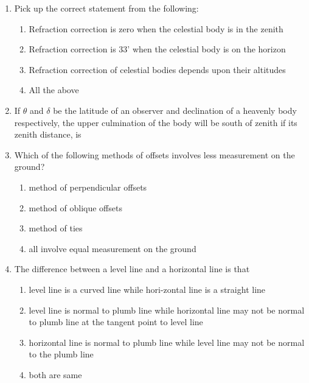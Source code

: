 \documentclass[11pt,a4paper]{article}
\begin{document}
\begin{enumerate}
\begin{enumerate}[label=\Alph*.]
\end{enumerate}
\item{Pick up the correct statement from the following:}
\begin{enumerate}[label=\Alph*.]
\item{Refraction correction is zero when the celestial body is in the zenith}
\item{Refraction correction is 33' when the celestial body is on the horizon}
\item{Refraction correction of celestial bodies depends upon their altitudes}
\item{All the above}
\end{enumerate}
\item{If $\theta$ and $\delta$ be the latitude of an observer and declination of a heavenly body respectively, the upper culmination of the body will be south of zenith if its zenith distance, is
}
\item{Which of the following methods of offsets involves less measurement on the ground?}
\begin{enumerate}[label=\Alph*.]
\item{method of perpendicular offsets}
\item{method of oblique offsets}
\item{method of ties}
\item{all involve equal measurement on the ground}
\end{enumerate}
\item{The difference between a level line and a horizontal line is that}
\begin{enumerate}[label=\Alph*.]
\item{level line is a curved line while hori-zontal line is a straight line}
\item{level line is normal to plumb line while horizontal line may not be normal to plumb line at the tangent point to level line}
\item{horizontal line is normal to plumb line while level line may not be normal to the plumb line}
\item{both are same}
\end{enumerate}

\end{enumerate}
\end{document}
